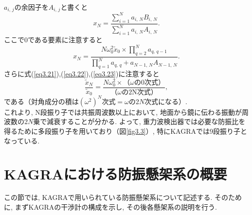 $a_{i,\,j}$の余因子を$A_{i,\,j}$と書くと
\begin{equation}
x_N=\frac{\sum\limits_{i=1}^{N}a_{i,\,N}B_{i,\,N}}{\sum\limits_{i=1}^{N}a_{i,\,N}A_{i,\,N}}.
\end{equation}
ここで0である要素に注意すると
\begin{equation}
x_N=\frac{N\omega_0^2\tilde{x}_0\times\prod\limits_{q=2}^{N}a_{q,\,q-1}}{\prod\limits_{q=1}^{N}a_{q,\,q}+a_{N-1,\,N}A_{N-1,\,N}}.
\end{equation}
さらに式(\ref{eq3.21}),(\ref{eq3.22}),(\ref{eq3.23})に注意すると
\begin{equation}
\frac{\tilde{x}_N}{\tilde{x}_0}=\frac{N\omega_0^2\times（\omega\text{の0次式}）}{（\omega\text{の2N次式}）},
\end{equation}
である（対角成分の積は$(\omega^2)^N$次式$=\omega$の2$N$次式になる）. \\
\quad これより, N段振り子では共振周波数以上において, 地面から鏡に伝わる振動が周波数の2$N$乗で減衰することが分かる. よって, 重力波検出器では必要な防振比を得るために多段振り子を用いており（図\ref{fig3.3}）, 特にKAGRAでは9段振り子となっている. 

\section{KAGRAにおける防振懸架系の概要}
この節では, KAGRAで用いられている防振懸架系について記述する. そのために, まずKAGRAの干渉計の構成を示し, その後各懸架系の説明を行う. 
